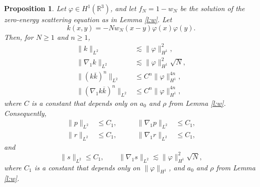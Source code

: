 \documentclass[11pt,a4paper]{scrartcl} %
\newtheorem{prp}[thm]{Proposition}
\newcommand{\R}{\mathds{R}}
\begin{document}
\begin{prp}
  \label{p:psr}
  Let $\varphi \in H^1(\R^3)$, and let $f_N=1-w_N$ be the solution of the
  zero-energy scattering equation as in Lemma \ref{l:w}. Let
  \[
    k(x,y) = - N w_N(x-y) \varphi(x) \varphi(y).
  \]
  Then, for $N \ge 1$ and $n \ge 1$,
  \begin{align}
    \| k \|_{L^2} & \apprle \| \varphi \|_{H^1}^2, \label{k} \tag{i} \\
    \| \nabla_1 k \|_{L^2} & \apprle \| \varphi \|_{H^1}^2 \sqrt{N},
    \label{gradk} \tag{ii} \\
    \| (k \overline{k})^n \|_{L^2} & \le C^n \| \varphi \|_{H^1}^{4n},
    \tag{iii} \\
    \| (\nabla_1 k \overline{k})^n \|_{L^2} & \le C^n \| \varphi
    \|_{H^1}^{4n}, \tag{iv}
  \end{align}
  where $C$ is a constant that depends only on $a_0$ and $\rho$ from Lemma
  \ref{l:w}. Consequently,
  \begin{equation}
    \begin{alignedat}{2}
      \| p \|_{L^2} & \le C_1, \qquad & \| \nabla_1 p \|_{L^2} & \le C_1, \\
      \| r \|_{L^2} & \le C_1, \qquad & \| \nabla_1 r \|_{L^2} & \le C_1,
    \end{alignedat}
    \tag{v}
  \end{equation}
  and
  \begin{equation}
    \| s \|_{L^2} \le C_1, \qquad \| \nabla_1 s \|_{L^2} \apprle \| \varphi
    \|_{H^1}^2 \sqrt{N}, \tag{vi}
  \end{equation}
  where $C_1$ is a constant that depends only on $\| \varphi \|_{H^1}$, and
  $a_0$ and $\rho$ from Lemma \ref{l:w}.
\end{prp}
\end{document}
